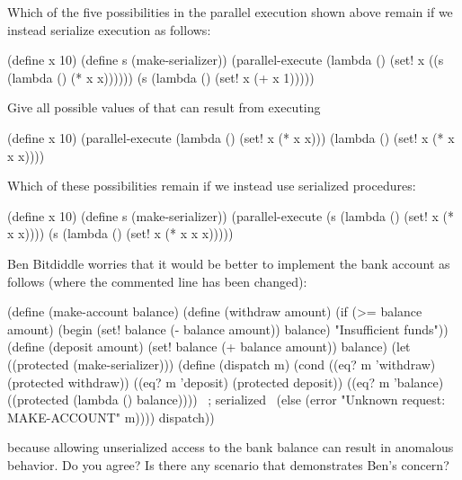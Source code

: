 \begin{exerciseGroup}
\label{Exercise 3.39}
 Which of the five possibilities
in the parallel execution shown above remain if we instead serialize execution
as follows:

\begin{codeBlock}
(define x 10)
(define s (make-serializer))
(parallel-execute
 (lambda () (set! x ((s (lambda () (* x x))))))
 (s (lambda () (set! x (+ x 1)))))
\end{codeBlock}

\label{Exercise 3.40}
 Give all possible values of
 that can result from executing

\begin{codeBlock}
(define x 10)
(parallel-execute (lambda () (set! x (* x x)))
                  (lambda () (set! x (* x x x))))
\end{codeBlock}

Which of these possibilities remain if we instead use serialized procedures:

\begin{codeBlock}
(define x 10)
(define s (make-serializer))
(parallel-execute (s (lambda () (set! x (* x x))))
                  (s (lambda () (set! x (* x x x)))))
\end{codeBlock}

\label{Exercise 3.41}
 Ben Bitdiddle worries that it
would be better to implement the bank account as follows (where the commented
line has been changed):

\begin{codeBlock}
(define (make-account balance)
  (define (withdraw amount)
    (if (>= balance amount)
        (begin (set! balance
                     (- balance amount))
               balance)
        "Insufficient funds"))
  (define (deposit amount)
    (set! balance (+ balance amount))
    balance)
  (let ((protected (make-serializer)))
    (define (dispatch m)
      (cond ((eq? m 'withdraw) (protected withdraw))
            ((eq? m 'deposit) (protected deposit))
            ((eq? m 'balance)
             ((protected
               (lambda () balance)))) ~\textrm{; serialized}~
            (else
             (error "Unknown request: MAKE-ACCOUNT"
                    m))))
    dispatch))
\end{codeBlock}

\noindent
because allowing unserialized access to the bank balance can result in
anomalous behavior.  Do you agree?  Is there any scenario that demonstrates
Ben's concern?


\end{exerciseGroup}
